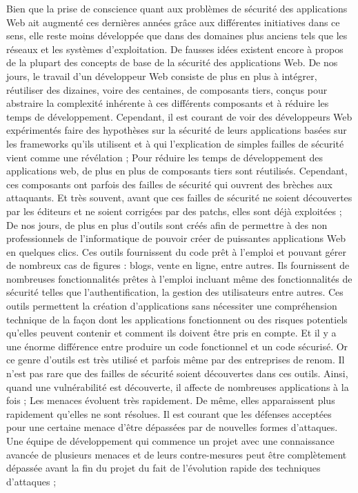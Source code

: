 \begin{itemize}
	\itemtirait Bien que la prise de conscience quant aux problèmes de sécurité des applications Web ait augmenté ces dernières années grâce aux différentes initiatives dans ce sens, elle reste moins développée que dans des domaines plus anciens tels que les réseaux et les systèmes d'exploitation. De fausses idées existent encore à propos de la plupart des concepts de base de la sécurité des applications Web. De nos jours, le travail d’un développeur Web consiste de plus en plus à intégrer, réutiliser des dizaines, voire des centaines, de composants tiers, conçus pour abstraire la complexité inhérente à ces différents composants et à réduire les temps de développement. Cependant, il est courant de voir des développeurs Web expérimentés faire des hypothèses sur la sécurité de leurs applications basées sur les frameworks qu’ils utilisent et à qui l’explication de simples failles de sécurité vient comme une révélation ;
	\itemtirait Pour réduire les temps de développement des applications web, de plus en plus de composants tiers sont réutilisés. Cependant, ces composants ont parfois des failles de sécurité qui ouvrent des brèches aux attaquants. Et très souvent, avant que ces failles de sécurité ne soient découvertes par les éditeurs et ne soient corrigées par des patchs, elles sont déjà exploitées ;
	\itemtirait De nos jours, de plus en plus d’outils sont créés afin de permettre à des non professionnels de l’informatique de pouvoir créer de puissantes applications Web en quelques clics. Ces outils fournissent du code prêt à l’emploi et pouvant gérer de nombreux cas de figures : blogs, vente en ligne, entre autres. Ils fournissent de nombreuses fonctionnalités prêtes à l’emploi incluant même des fonctionnalités de sécurité telles que l’authentification, la gestion des utilisateurs entre autres. Ces outils permettent la création d’applications sans nécessiter une compréhension technique de la façon dont les applications fonctionnent ou des risques potentiels qu'elles peuvent contenir et comment ils doivent être pris en compte. Et il y a une énorme différence entre produire un code fonctionnel et un code sécurisé. Or ce genre d’outils est très utilisé et parfois même par des entreprises de renom. Il n’est pas rare que des failles de sécurité soient découvertes dans ces outils. Ainsi, quand une vulnérabilité est découverte, il affecte de nombreuses applications à la fois ;
	\itemtirait Les menaces évoluent très rapidement. De même, elles apparaissent plus rapidement qu’elles ne sont résolues. Il est courant que les défenses acceptées pour une certaine menace d’être dépassées par de nouvelles formes d’attaques. Une équipe de développement qui commence un projet avec une connaissance avancée de plusieurs menaces et de leurs contre-mesures peut être complètement dépassée avant la fin du projet du fait de l’évolution rapide des techniques d’attaques ;

\end{itemize}
